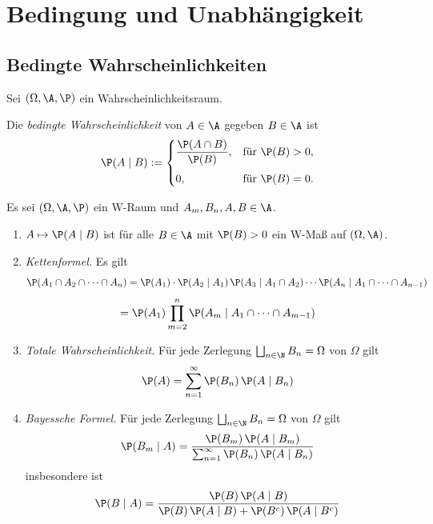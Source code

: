 \documentclass[11pt, a4paper]{article}
\begin{document}
\newpage

\section{Bedingung und Unabhängigkeit}

\subsection{Bedingte Wahrscheinlichkeiten}

Sei $(\Omega, \A, \P)$ ein Wahrscheinlichkeitsraum. 


\begin{definition}\Theorem
    Die \emph{bedingte Wahrscheinlichkeit} von $A \in \A$ gegeben $B \in \A$ ist
    $$\P(A \mid B) := \begin{cases} \dfrac{\P(A \cap B)}{\P(B)}, & \text{für } \P(B) > 0, \\[1em] 0, & \text{für } \P(B) = 0. \end{cases}$$
\end{definition}


\begin{theorem}\Theorem
    Es sei $(\Omega, \A, \P)$ ein W-Raum und $A_m, B_n, A, B \in \A$.
    \begin{enumerate}[label=\alph*)]
        \item $A \mapsto \P(A \mid B)$ ist für alle $B \in \A$ mit $\P(B) > 0$ ein W-Maß auf $(\Omega, \A)$.
        \item \emph{Kettenformel.} Es gilt
        $$\P(A_1 \cap A_2 \cap \cdots \cap A_n) = \P(A_1)\cdot \P(A_2\mid A_1)\, \P(A_3 \mid A_1\cap A_2)\cdots \P(A_n \mid A_1 \cap \cdots \cap A_{n-1}) $$
        $$= \P(A_1) \prod_{m=2}^n \P(A_m \mid A_1 \cap \cdots \cap A_{m-1})$$
        \item \emph{Totale Wahrscheinlichkeit.} Für jede Zerlegung $\bigsqcup_{n\in\N} B_n = \Omega$ von $\Omega$ gilt
        $$\P(A) = \sum_{n=1}^\infty \P(B_n)\, \P(A \mid B_n)$$
        \item \emph{Bayessche Formel.} Für jede Zerlegung $\bigsqcup_{n\in\N} B_n = \Omega$ von $\Omega$ gilt
        $$\P(B_m \mid A) = \frac{\P(B_m)\, \P(A \mid B_m)}{\sum_{n=1}^\infty \P(B_n)\, \P(A \mid B_n)}$$
        insbesondere ist
        $$\P(B \mid A) = \frac{\P(B)\, \P(A \mid B)}{\P(B)\, \P(A \mid B) + \P(B^c)\, \P(A \mid B^c)}$$
    \end{enumerate}
\end{theorem}
\end{document}
